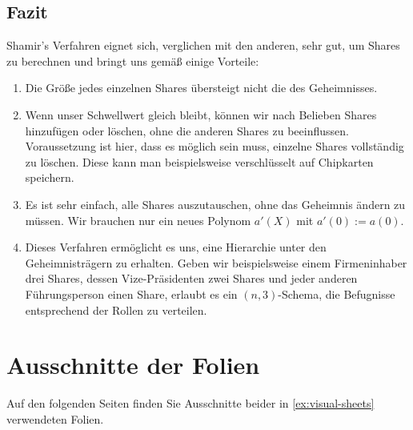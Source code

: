 \documentclass[12pt, a4paper, oneside, titlepage]{report}
\theoremstyle{definition}
\begin{document}
	\section{Fazit}
	Shamir's Verfahren eignet sich, verglichen mit den anderen, sehr gut, um Shares zu berechnen und bringt uns gemäß \cite{shamir} einige Vorteile:
	
	\begin{enumerate}
		\item {
			Die Größe jedes einzelnen Shares übersteigt nicht die des Geheimnisses.
		}
		\item {
			Wenn unser Schwellwert gleich bleibt, können wir nach Belieben Shares hinzufügen oder löschen, ohne die anderen Shares zu beeinflussen. Voraussetzung ist hier, dass es möglich sein muss, einzelne Shares vollständig zu löschen. Diese kann man beispielsweise verschlüsselt auf Chipkarten speichern.
		}
		\item {
			Es ist sehr einfach, alle Shares auszutauschen, ohne das Geheimnis ändern zu müssen. Wir brauchen nur ein neues Polynom $ a'(X) $ mit $ a'(0) := a(0) $.
		}
		\item {
			Dieses Verfahren ermöglicht es uns, eine Hierarchie unter den Geheimnisträgern zu erhalten. Geben wir beispielsweise einem Firmeninhaber drei Shares, dessen Vize-Präsidenten zwei Shares und jeder anderen Führungsperson einen Share, erlaubt es ein $ (n, 3) $-Schema, die Befugnisse entsprechend der Rollen zu verteilen.
		}
	\end{enumerate}
	\cleardoublepage
	\begingroup
	\let\clearpage\relax
	
	\endgroup

	\appendix
	\chapter{Ausschnitte der Folien}\label{appendix}
	Auf den folgenden Seiten finden Sie Ausschnitte beider in \ref{ex:visual-sheets} verwendeten Folien.
	
	\newpage\null\thispagestyle{empty}\newpage
\end{document}
